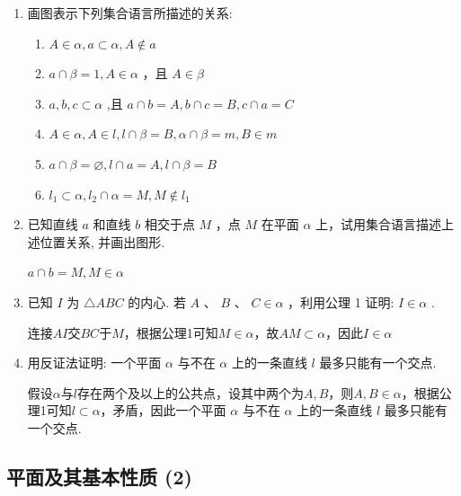 \begin{enumerate}
    \item 画图表示下列集合语言所描述的关系:
    \begin{enumerate}
        \item $A \in  \alpha ,a \subset  \alpha ,A \notin  a$
        \item $a \cap  \beta  = 1,A \in  \alpha$ ，且 $A \in  \beta$
        \item $a,b,c \subset  \alpha$ ,且 $a \cap  b = A,b \cap  c = B,c \cap  a = C$
        \item $A \in  \alpha, A \in  l,l \cap  \beta  = B, \alpha \cap  \beta  = m,B \in  m$
        \item $a \cap  \beta  = \varnothing ,l \cap  a = A,l \cap  \beta  = B$ 
        \item ${l}_{1} \subset  \alpha,{l}_{2} \cap  \alpha = M,M \notin  {l}_{1}$
    \end{enumerate}
    
    \item 已知直线 $a$ 和直线 $b$ 相交于点 $M$ ，点 $M$ 在平面 $\alpha$ 上，试用集合语言描述上述位置关系, 并画出图形.
    \begin{jieda}
        $a \cap b = M, M \in \alpha$
    \end{jieda}
    
    \item 已知 $I$ 为 $\bigtriangleup  {ABC}$ 的内心. 若 $A$ 、 $B$ 、 $C \in  \alpha$ ，利用公理 1 证明: $I \in  \alpha$ .
    \begin{jieda}
        连接$AI$交$BC$于$M$，根据公理1可知$M \in \alpha$，故$AM \subset \alpha$，因此$I \in \alpha$
    \end{jieda}
    
    \item 用反证法证明: 一个平面 $\alpha$ 与不在 $\alpha$ 上的一条直线 $l$ 最多只能有一个交点.
    \begin{jieda}
        假设$\alpha$与$l$存在两个及以上的公共点，设其中两个为$A,B$，则$A, B \in \alpha$，根据公理1可知$l \subset \alpha$，矛盾，因此一个平面 $\alpha$ 与不在 $\alpha$ 上的一条直线 $l$ 最多只能有一个交点.
    \end{jieda}
\end{enumerate}

\clearpage
\subsection*{平面及其基本性质 (2)}

